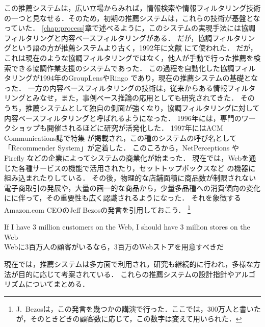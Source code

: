 この推薦システムは，広い立場からみれば，情報検索や情報フィルタリング技術の一つと見なせる．そのため，初期の推薦システムは，これらの技術が基盤となっていた．
\ref{chap:process}章で述べるように，このシステムの実現手法には協調フィルタリングと内容ベースフィルタリングがある．
だが，協調フィルタリングという語の方が推薦システムより古く，1992年に文献 \cite{macm:92:01} にて使われた．
だが，これは現在のような協調フィルタリングではなく，他人が手動で行った推薦を検索できる協調作業支援のシステムであった．
この過程を自動化した協調フィルタリングが1994年のGroupLens\cite{cscw:94:01}やRingo \cite{sigchi:95:02}であり，現在の推薦システムの基礎となった．
一方の内容ベースフィルタリングの技術は，従来からある情報フィルタリングとみなせ，また，事例ベース推論の応用としても研究されてきた．
そのうち，推薦システムとして独自の側面が強くなり，協調フィルタリングに対して内容ベースフィルタリングと呼ばれるようになった．
1996年には，専門のワークショップも開催されるほどに研究が活発化した．
1997年にはACM Communications誌で特集\cite{macm:97:01} が掲載され，この種のシステムの呼び名として「Recommender System」が定着した．
このころから，NetPerceptions や Firefly などの企業によってシステムの商業化が始まった．
現在では，Webを通じた各種サービスの機能で活用されたり\cite{ieeem:99:02,ieeem:03:01,www:07:01}，セットトップボックスなど
の機器に組み込まれたり\cite{kdd:04:11}している．
その後，物理的な店舗面積に商品数が制限されない電子商取引の発展や，大量の画一的な商品から，少量多品種への消費傾向の変化にに伴って，その重要性も広く認識されるようになった．
それを象徴する Amazon.com CEOのJeff Bezosの発言を引用しておこう\cite{dmkd:01:01}．
\footnote{J.~Bezosは，この発言を幾つかの講演で行った．ここでは，300万人と書いたが，そのときどきの顧客数に応じて，この数字は変えて用いられた．} %
\begin{center}
If I have 3 million customers on the Web, I should have 3 million stores on the Web\\
Webに3百万人の顧客がいるなら，3百万のWebストアを用意すべきだ
\end{center}
現在では，推薦システムは多方面で利用され，研究も継続的に行われ，多様な方法が目的に応じて考案されている．
これらの推薦システムの設計指針やアルゴリズムについてまとめる．
